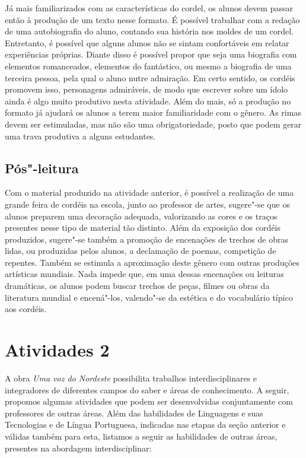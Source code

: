 \documentclass[12pt]{extarticle}
\begin{document}
Já mais familiarizados com as características do cordel, os
alunos devem passar então à produção de um texto nesse formato. É
possível trabalhar com a redação de uma autobiografia do aluno, contando
sua história nos moldes de um cordel. Entretanto, é possível que alguns
alunos não se sintam confortáveis em relatar experiências próprias.
Diante disso é possível propor que seja uma biografia com elementos
romanceados, elementos do fantástico, ou mesmo a biografia de uma
terceira pessoa, pela qual o aluno nutre admiração. Em certo sentido, os
cordéis promovem isso, personagens admiráveis, de modo que escrever
sobre um ídolo ainda é algo muito produtivo nesta atividade. Além do
mais, só a produção no formato já ajudará os alunos a terem maior
familiaridade com o gênero. As rimas devem ser estimuladas, mas não são
uma obrigatoriedade, posto que podem gerar uma trava produtiva a alguns
estudantes.

\subsection{Pós"-leitura}


Com o material produzido na atividade anterior, é possível a
realização de uma grande feira de cordéis na escola, junto ao professor
de artes, sugere"-se que os alunos preparem uma decoração adequada,
valorizando as cores e os traços presentes nesse tipo de material tão
distinto. Além da exposição dos cordéis produzidos, sugere"-se também a
promoção de encenações de trechos de obras lidas, ou produzidas pelos
alunos, a declamação de poemas, competição de repentes. Também se
estimula a aproximação deste gênero com outras produções artísticas
mundiais. Nada impede que, em uma dessas encenações ou leituras
dramáticas, os alunos podem buscar trechos de peças, filmes ou obras da
literatura mundial e encená"-los, valendo"-se da estética e do vocabulário
típico aos cordéis.

\section{Atividades 2}


A obra \emph{Uma voz do Nordeste} possibilita trabalhos
interdisciplinares e integradores de diferentes campos do saber e áreas
de conhecimento. A seguir, propomos algumas atividades que podem ser
desenvolvidas conjuntamente com professores de outras áreas. Além das
habilidades de Linguagens e suas Tecnologias e de Língua Portuguesa,
indicadas nas etapas da seção anterior e válidas também para esta,
listamos a seguir as habilidades de outras áreas, presentes na abordagem
interdisciplinar:
\end{document}
